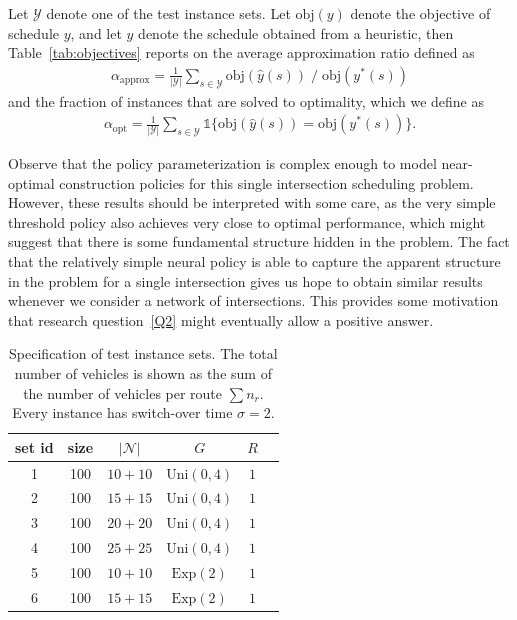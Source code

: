 \documentclass{article}
\theoremstyle{definition}
\theoremstyle{plain}
\begin{document}
Let $\mathcal{Y}$ denote one of the test instance sets. Let $\text{obj}(y)$
denote the objective of schedule $y$, and let $\hat{y}$ denote the schedule
obtained from a heuristic, then Table~\ref{tab:objectives} reports on the
average approximation ratio defined as
\begin{align*}
  \alpha_{\text{approx}} = \frac{1}{|\mathcal{Y}|} \sum_{s \in \mathcal{Y}} \text{obj}(\hat{y}(s)) \; / \; \text{obj}(y^{*}(s))
\end{align*}
and the fraction of instances that are solved to optimality, which
we define as
\begin{align*}
  \alpha_{\text{opt}} = \frac{1}{|\mathcal{Y}|} \sum_{s \in \mathcal{Y}} \mathds{1}\{ \text{obj}(\hat{y}(s)) = \text{obj}(y^{*}(s)) \} .
\end{align*}


Observe that the policy parameterization is complex enough to model near-optimal
construction policies for this single intersection scheduling problem. However,
these results should be interpreted with some care, as the very simple threshold
policy also achieves very close to optimal performance, which might suggest that
there is some fundamental structure hidden in the problem.
%
The fact that the relatively simple neural policy is able to capture the
apparent structure in the problem for a single intersection gives us hope to
obtain similar results whenever we consider a network of intersections. This
provides some motivation that research question~\ref{Q2} might eventually allow
a positive answer.



\begin{table}[H]
  \caption{Specification of test instance sets. The total number of vehicles is
    shown as the sum of the number of vehicles per route $\sum n_{r}$. Every
    instance has switch-over time $\sigma = 2$.}\label{tab:params}
  \vspace{0.5em}
  \centering
  \begin{tabular}[t]{c c c c c c}
    \toprule
    set id & size & $|\mathcal{N}|$ & $G$ & $R$ \\
    \midrule

    1 & 100 & $10 + 10$ & $\text{Uni}(0, 4)$ & $1$ \\
    2 & 100 & $15 + 15$ & $\text{Uni}(0, 4)$ & $1$ \\
    3 & 100 & $20 + 20$ & $\text{Uni}(0, 4)$ & $1$ \\
    4 & 100 & $25 + 25$ & $\text{Uni}(0, 4)$ & $1$ \\ %

    5 & 100 & $10 + 10$ & $\text{Exp}(2)$    & $1$ \\
    6 & 100 & $15 + 15$ & $\text{Exp}(2)$    & $1$ \\

    \bottomrule
  \end{tabular}
\end{table}
\end{document}
